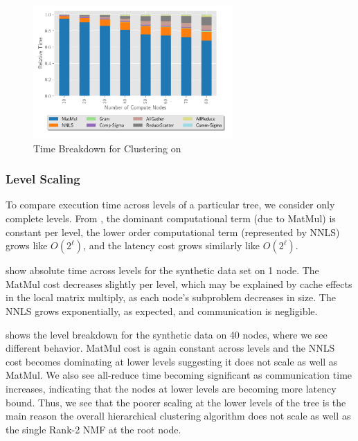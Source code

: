 \begin{figure}
\begin{center}
\includegraphics[height=2in, width=\columnwidth]{plots/realworld_hier_strongscaling.pdf}
\caption{Time Breakdown for Clustering on \image{}}
\label{fig:rwhierstrongscaling}
\end{center}
\end{figure}

\subsubsection{Level Scaling}

To compare execution time across levels of a particular tree, we consider only complete levels. 
From , the dominant computational term (due to MatMul) is constant per level, the lower order 
computational term (represented by NNLS) grows like $O(2^\ell)$, and the latency cost grows similarly like $O(2^\ell)$. 

 show absolute time across levels for the synthetic data set on 1 node.
The MatMul cost decreases slightly per level, which may be explained by cache effects in the local matrix multiply, as each node's subproblem decreases in size. 
The NNLS grows exponentially, as expected, and communication is negligible.

 shows the level breakdown for the synthetic data on 40 nodes, where we see different behavior.
MatMul cost is again constant across levels and the NNLS cost becomes dominating at lower levels suggesting it does not scale as well as MatMul. 
We also see all-reduce time becoming significant as communication time increases, indicating that the nodes at lower levels are becoming more latency bound.
Thus, we see that the poorer scaling at the lower levels of the tree is the main reason the overall hierarchical clustering algorithm does not scale as well as the single Rank-2 NMF at the root node.

